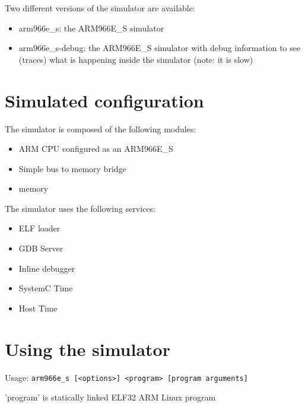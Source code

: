 Two different versions of the simulator are available:
\begin{itemize}
	\item arm966e\_s: the ARM966E\_S simulator
    \item arm966e\_s-debug: the ARM966E\_S simulator with debug information to see (traces) what is happening inside the simulator (note: it is slow)
\end{itemize}

\section{Simulated configuration}

The simulator is composed of the following modules:
\begin{itemize}\addtolength{\itemsep}{-0.40\baselineskip}
\item ARM CPU configured as an ARM966E\_S
\item Simple bus to memory bridge
\item memory
\end{itemize}

The simulator uses the following services:
\begin{itemize}\addtolength{\itemsep}{-0.40\baselineskip}
\item ELF loader
\item GDB Server
\item Inline debugger
\item SystemC Time
\item Host Time
\end{itemize}

\section{Using the simulator}

Usage: \texttt{arm966e\_s [<options>] <program> [program arguments]}

     'program' is statically linked ELF32 ARM Linux program


